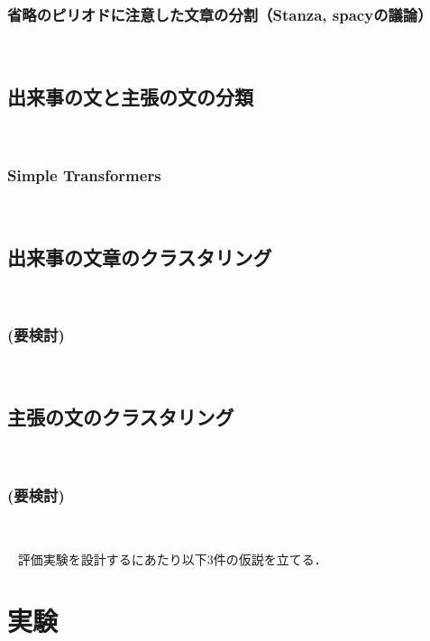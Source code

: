 \documentclass[12pt,a4j]{jreport}
\begin{document}
\subsection{省略のピリオドに注意した文章の分割（Stanza, spacyの議論）}
~

\section{出来事の文と主張の文の分類}
~

\subsection{Simple Transformers}
~

\section{出来事の文章のクラスタリング}
~

\subsection{(要検討)}
~

\section{主張の文のクラスタリング}
~

\subsection{(要検討)}
~


~%
 評価実験を設計するにあたり以下3件の仮説を立てる．


\chapter{実験}
\end{document}

